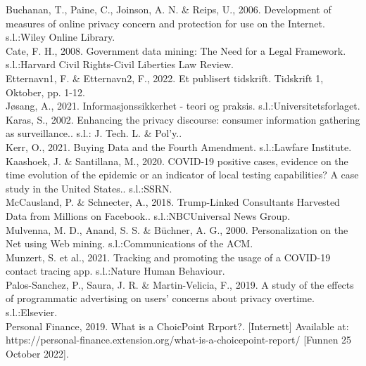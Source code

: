 \documentclass[11pt]{article}
\begin{document}
Buchanan, T., Paine, C., Joinson, A. N. \& Reips, U., 2006. Development of measures of online privacy concern and protection for use on the Internet. s.l.:Wiley Online Library. \\

Cate, F. H., 2008. Government data mining: The Need for a Legal Framework. s.l.:Harvard Civil Rights-Civil Liberties Law Review. \\

Etternavn1, F. \& Etternavn2, F., 2022. Et publisert tidskrift. Tidskrift 1, Oktober, pp. 1-12. \\

Jøsang, A., 2021. Informasjonssikkerhet - teori og praksis. s.l.:Universitetsforlaget. \\

Karas, S., 2002. Enhancing the privacy discourse: consumer information gathering as surveillance.. s.l.: J. Tech. L. \& Pol'y.. \\

Kerr, O., 2021. Buying Data and the Fourth Amendment. s.l.:Lawfare Institute. \\

Kaashoek, J. \& Santillana, M., 2020. COVID-19 positive cases, evidence on the time evolution of the epidemic or an indicator of local testing capabilities? A case study in the United States.. s.l.:SSRN. \\

McCausland, P. \& Schnecter, A., 2018. Trump-Linked Consultants Harvested Data from Millions on Facebook.. s.l.:NBCUniversal News Group. \\

Mulvenna, M. D., Anand, S. S. \& Büchner, A. G., 2000. Personalization on the Net using Web mining. s.l.:Communications of the ACM. \\

Munzert, S. et al., 2021. Tracking and promoting the usage of a COVID-19 contact tracing app. s.l.:Nature Human Behaviour. \\

Palos-Sanchez, P., Saura, J. R. \& Martin-Velicia, F., 2019. A study of the effects of programmatic advertising on users' concerns about privacy overtime. s.l.:Elsevier. \\

Personal Finance, 2019. What is a ChoicPoint Rrport?. [Internett]  
Available at: https://personal-finance.extension.org/what-is-a-choicepoint-report/ 
[Funnen 25 October 2022]. \\
\end{document}
